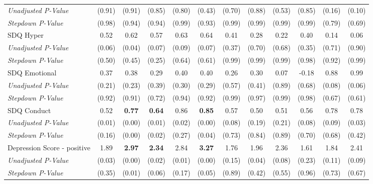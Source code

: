 \begin{tabular}{l c c c c c c c c c c c}
\quad \textit{Unadjusted P-Value} & (0.91) & (0.91) & (0.85) & (0.80) & (0.43) & (0.70) & (0.88) & (0.53) & (0.85) & (0.16) & (0.10) \\
\quad \textit{Stepdown P-Value} & (0.98) & (0.94) & (0.94) & (0.99) & (0.93) & (0.99) & (0.99) & (0.99) & (0.99) & (0.79) & (0.69) \\
SDQ Hyper & 0.52 & 0.62 & 0.57 & 0.63 & 0.64 & 0.41 & 0.28 & 0.22 & 0.40 & 0.14 & 0.06 \\
\quad \textit{Unadjusted P-Value} & (0.06) & (0.04) & (0.07) & (0.09) & (0.07) & (0.37) & (0.70) & (0.68) & (0.35) & (0.71) & (0.90) \\
\quad \textit{Stepdown P-Value} & (0.50) & (0.45) & (0.25) & (0.64) & (0.61) & (0.99) & (0.99) & (0.99) & (0.98) & (0.92) & (0.99) \\
SDQ Emotional & 0.37 & 0.38 & 0.29 & 0.40 & 0.40 & 0.26 & 0.30 & 0.07 & -0.18 & 0.88 & 0.99 \\
\quad \textit{Unadjusted P-Value} & (0.21) & (0.23) & (0.39) & (0.30) & (0.29) & (0.57) & (0.41) & (0.89) & (0.68) & (0.08) & (0.06) \\
\quad \textit{Stepdown P-Value} & (0.92) & (0.91) & (0.72) & (0.94) & (0.92) & (0.99) & (0.97) & (0.99) & (0.98) & (0.67) & (0.61) \\
SDQ Conduct & 0.52 & \textbf{ 0.77 } & \textbf{ 0.64 } & 0.86 & \textbf{ 0.85 } & 0.57 & 0.50 & 0.51 & 0.56 & 0.78 & 0.78 \\
\quad \textit{Unadjusted P-Value} & (0.01) & (0.00) & (0.01) & (0.02) & (0.00) & (0.08) & (0.19) & (0.21) & (0.08) & (0.09) & (0.03) \\
\quad \textit{Stepdown P-Value} & (0.16) & (0.00) & (0.02) & (0.27) & (0.04) & (0.73) & (0.84) & (0.89) & (0.70) & (0.68) & (0.42) \\
Depression Score - positive & 1.89 & \textbf{ 2.97 } & \textbf{ 2.34 } & 2.84 & \textbf{ 3.27 } & 1.76 & 1.96 & 2.36 & 1.61 & 1.84 & 2.41 \\
\quad \textit{Unadjusted P-Value} & (0.03) & (0.00) & (0.02) & (0.01) & (0.00) & (0.15) & (0.04) & (0.08) & (0.23) & (0.11) & (0.09) \\
\quad \textit{Stepdown P-Value} & (0.35) & (0.01) & (0.06) & (0.17) & (0.05) & (0.89) & (0.42) & (0.55) & (0.96) & (0.73) & (0.67) \\
\bottomrule
\end{tabular}
